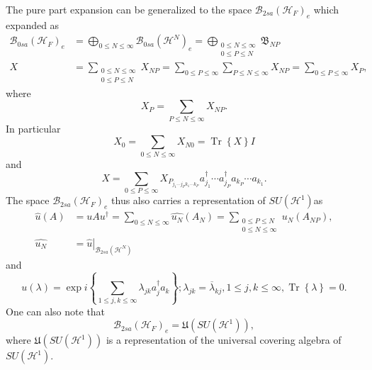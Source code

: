 \documentclass[aps,preprint]{revtex4}%
\begin{document}
The pure part expansion can be generalized to the space $\mathcal{B}%
_{2sa}\left(  \mathcal{H}_{F}\right)  _{e}$ which expanded as
\begin{align}
\mathcal{B}_{0sa}\left(  \mathcal{H}_{F}\right)  _{e}  &  =%
{\displaystyle\bigoplus\limits_{0\leq N\leq\infty}}
\mathcal{B}_{0sa}\left(  \mathcal{H}^{N}\right)  _{e}=%
{\displaystyle\bigoplus\limits_{\substack{0\leq N\leq\infty\\0\leq P\leq N}}}
\mathfrak{B}_{NP}\\
X  &  =\sum_{\substack{0\leq N\leq\infty\\0\leq P\leq N}}X_{NP}=\sum_{0\leq
P\leq\infty}\sum_{P\leq N\leq\infty}X_{NP}=\sum_{0\leq P\leq\infty}X_{P},
\end{align}
where
\begin{equation}
X_{P}=\sum_{P\leq N\leq\infty}X_{NP}.
\end{equation}
In particular
\begin{equation}
X_{0}=\sum_{0\leq N\leq\infty}X_{N0}=\operatorname*{Tr}\left\{  X\right\}  I
\end{equation}
and
\begin{equation}
X=\sum_{0\leq P\leq\infty}X_{P_{j_{1}\cdots j_{P}k_{1}\cdots k_{P}}}a_{j_{1}%
}^{\dagger}\cdots a_{j_{P}}^{\dagger}a_{k_{P}}\cdots a_{k_{1}}.
\end{equation}
The space $\mathcal{B}_{2sa}\left(  \mathcal{H}_{F}\right)  _{e}$ thus also
carries a representation of $SU\left(  \mathcal{H}^{1}\right)  $as
\begin{align}
\widehat{u}(A)  &  =uAu^{\dagger}=\sum_{0\leq N\leq\infty}\widehat{u_{N}%
}\left(  A_{N}\right)  =\sum_{\substack{0\leq P\leq N\\0\leq N\leq\infty
}}\widehat{u_{N}}\left(  A_{NP}\right)  ,\\
\widehat{u_{N}}  &  =\left.  \widehat{u}\right\vert _{\mathcal{B}_{2sa}\left(
\mathcal{H}^{N}\right)  }%
\end{align}
and
\begin{equation}
u\left(  \lambda\right)  =\exp i\left\{  \sum_{1\leq j,k\leq\infty}%
\lambda_{jk}a_{j}^{\dagger}a_{k}\right\}  ;\lambda_{jk}=\overline{\lambda
}_{kj},1\leq j,k\leq\infty,\operatorname*{Tr}\left\{  \lambda\right\}  =0.
\end{equation}
One can also note that
\begin{equation}
\mathcal{B}_{2sa}\left(  \mathcal{H}_{F}\right)  _{e}=\mathfrak{U}\left(
SU\left(  \mathcal{H}^{1}\right)  \right)  ,
\end{equation}
where $\mathfrak{U}\left(  SU\left(  \mathcal{H}^{1}\right)  \right)  $ is a
representation of the universal covering algebra of $SU\left(  \mathcal{H}%
^{1}\right)  .$
\end{document}
